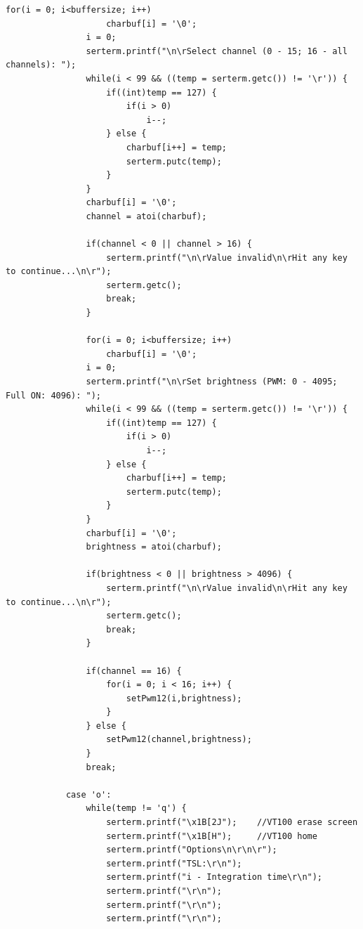 \documentclass[a4paper,12pt]{scrartcl}
\begin{document}
\begin{lstlisting}[captionpos=b, caption=MBED-Programmcode für den Messaufbau, label=messprogkomplett]
                for(i = 0; i<buffersize; i++)
                    charbuf[i] = '\0';
                i = 0;
                serterm.printf("\n\rSelect channel (0 - 15; 16 - all channels): ");
                while(i < 99 && ((temp = serterm.getc()) != '\r')) {
                    if((int)temp == 127) {
                        if(i > 0)
                            i--;
                    } else {
                        charbuf[i++] = temp;
                        serterm.putc(temp);
                    }
                }
                charbuf[i] = '\0';
                channel = atoi(charbuf);

                if(channel < 0 || channel > 16) {
                    serterm.printf("\n\rValue invalid\n\rHit any key to continue...\n\r");
                    serterm.getc();
                    break;
                }

                for(i = 0; i<buffersize; i++)
                    charbuf[i] = '\0';
                i = 0;
                serterm.printf("\n\rSet brightness (PWM: 0 - 4095; Full ON: 4096): ");
                while(i < 99 && ((temp = serterm.getc()) != '\r')) {
                    if((int)temp == 127) {
                        if(i > 0)
                            i--;
                    } else {
                        charbuf[i++] = temp;
                        serterm.putc(temp);
                    }
                }
                charbuf[i] = '\0';
                brightness = atoi(charbuf);

                if(brightness < 0 || brightness > 4096) {
                    serterm.printf("\n\rValue invalid\n\rHit any key to continue...\n\r");
                    serterm.getc();
                    break;
                }

                if(channel == 16) {
                    for(i = 0; i < 16; i++) {
                        setPwm12(i,brightness);
                    }
                } else {
                    setPwm12(channel,brightness);
                }
                break;

            case 'o':
                while(temp != 'q') {
                    serterm.printf("\x1B[2J");    //VT100 erase screen
                    serterm.printf("\x1B[H");     //VT100 home
                    serterm.printf("Options\n\r\n\r");
                    serterm.printf("TSL:\r\n");
                    serterm.printf("i - Integration time\r\n");
                    serterm.printf("\r\n");
                    serterm.printf("\r\n");
                    serterm.printf("\r\n");


\end{lstlisting}
\end{document}
